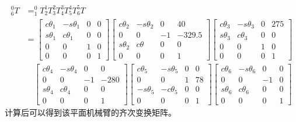 \documentclass[12pt,a4paper,openany,oneside]{book}%
\numberwithin{equation}{chapter}%
\numberwithin{figure}{chapter}%
\begin{document}
\begin{equation}\label{fhbh1}
\begin{aligned}
  ^0_{6}T & =^0_1T ^1_2T ^2_3T ^3_4T ^4_5T ^5_6T \\
        & =\begin{bmatrix}
             c\theta_1 & -s\theta_1 & 0 & 0 \\
             s\theta_1 & c\theta_1 & 0 & 0\\
             0 & 0 & 1 & 0\\
             0 & 0 & 0 & 1
           \end{bmatrix}
           \begin{bmatrix}
             c\theta_2 & -s\theta_2 & 0 & 40 \\
             0 & 0 & -1 & -329.5\\
             s\theta_2 & c\theta & 0 & 0\\
             0 & 0 & 0 & 1
           \end{bmatrix}
           \begin{bmatrix}
             c\theta_3 & -s\theta_3 & 0 & 275 \\
             s\theta_3 & c\theta_3 & 0 & 0\\
             0 & 0 & 1 & 0\\
             0 & 0 & 0 & 1
           \end{bmatrix}\\
          &\quad\begin{bmatrix}
             c\theta_4 & -s\theta_4 & 0 & 0 \\
             0 & 0 & -1 & -280\\
             s\theta_4 & c\theta_4 & 0 & 0\\
             0 & 0 & 0 & 1
           \end{bmatrix}
           \begin{bmatrix}
             c\theta_5 & -s\theta_5 & 0 & 0 \\
             0 & 0 & 1 & 78\\
             -s\theta_5 & -c\theta_5 & 0 & 0\\
             0 & 0 & 0 & 1
           \end{bmatrix}
           \begin{bmatrix}
             c\theta_6 & -s\theta_6 & 0 & 0 \\
             0 & 0 & -1 & 0\\
             s\theta_6 & c\theta_6 & 0 & 0\\
             0 & 0 & 0 & 1
           \end{bmatrix}
\end{aligned}
\end{equation}
计算后可以得到该平面机械臂的齐次变换矩阵。\par
\end{document}
